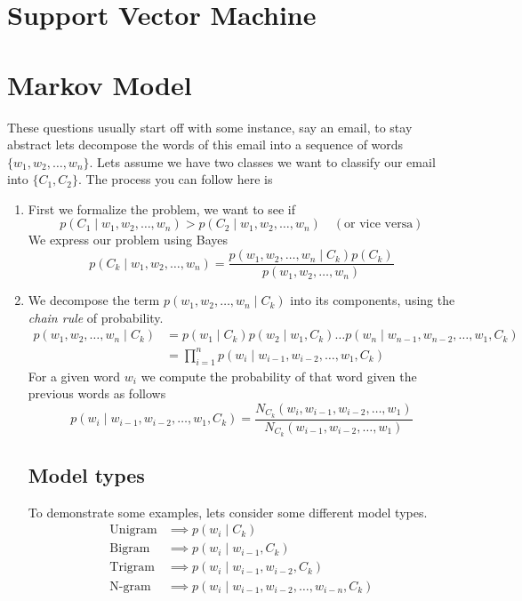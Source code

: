 \documentclass[12pt]{article}
\begin{document}
\section{Support Vector Machine}

\section{Markov Model}

These questions usually start off with some instance, say an email, to stay abstract lets decompose the words of this email into a sequence of words $\{w_1, w_2, \ldots, w_n\}$. Lets assume we have two classes we want to classify our email into $\{C_1, C_2\}$. The process you can follow here is 
\begin{enumerate}[leftmargin=*, noitemsep]
    \item First we formalize the problem, we want to see if 
    \[
        p(C_1\mid w_1, w_2, \ldots, w_n) > p(C_2\mid w_1, w_2, \ldots, w_n) \quad (\text{or vice versa})
    \]
    We express our problem using Bayes 
    \[
        p(C_k\mid w_1, w_2, \ldots, w_n) = \frac{p(w_1, w_2, \ldots, w_n\mid C_k)p(C_k)}{p(w_1, w_2, \ldots, w_n)}    
    \]
    \item We decompose the term $p(w_1, w_2, \ldots, w_n\mid C_k)$ into its components, using the \textit{chain rule} of probability. 
    \begin{align*}
        p(w_1, w_2, \ldots, w_n\mid C_k) &= p(w_1\mid C_k)p(w_2\mid w_1, C_k)\dots p(w_n\mid w_{n-1}, w_{n-2}, \ldots, w_1, C_k) \\
        &= \prod_{i=1}^{n}p(w_i\mid w_{i-1}, w_{i-2}, \ldots, w_1, C_k)
    \end{align*}
    For a given word $w_i$ we compute the probability of that word given the previous words as follows 
    \[
        p(w_i\mid w_{i-1}, w_{i-2}, \ldots, w_1, C_k) = \frac{N_{C_k}(w_i, w_{i-1}, w_{i-2}, \ldots, w_1)}{N_{C_k}(w_{i-1}, w_{i-2}, \ldots, w_1)}  
    \]
    \subsection{Model types}
    To demonstrate some examples, lets consider some different model types. 
    \begin{align*}
        \text{Unigram} &\implies p(w_i\mid C_k) \\
        \text{Bigram} &\implies p(w_i\mid w_{i-1}, C_k) \\
        \text{Trigram} &\implies p(w_i\mid w_{i-1}, w_{i-2}, C_k) \\
        \text{N-gram} &\implies p(w_i\mid w_{i-1}, w_{i-2}, \ldots, w_{i-n}, C_k)
    \end{align*}
\end{enumerate}
\end{document}
